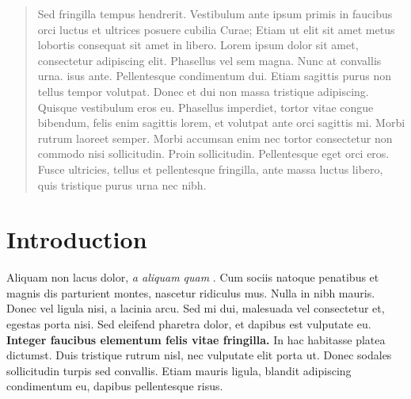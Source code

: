 \documentclass[a0,portrait]{poster}
\begin{document}
\begin{multicols}{2} %


\color{Navy} %

\begin{abstract}

Sed fringilla tempus hendrerit. Vestibulum ante ipsum primis in faucibus orci luctus et ultrices posuere cubilia Curae; Etiam ut elit sit amet metus lobortis consequat sit amet in libero. Lorem ipsum dolor sit amet, consectetur adipiscing elit. Phasellus vel sem magna. Nunc at convallis urna. isus ante. Pellentesque condimentum dui. Etiam sagittis purus non tellus tempor volutpat. Donec et dui non massa tristique adipiscing. Quisque vestibulum eros eu. Phasellus imperdiet, tortor vitae congue bibendum, felis enim sagittis lorem, et volutpat ante orci sagittis mi. Morbi rutrum laoreet semper. Morbi accumsan enim nec tortor consectetur non commodo nisi sollicitudin. Proin sollicitudin. Pellentesque eget orci eros. Fusce ultricies, tellus et pellentesque fringilla, ante massa luctus libero, quis tristique purus urna nec nibh.

\end{abstract}


\color{SaddleBrown} %

\section*{Introduction}

Aliquam non lacus dolor, \textit{a aliquam quam} \cite{zhang2018ndnfit}. Cum sociis natoque penatibus et magnis dis parturient montes, nascetur ridiculus mus. Nulla in nibh mauris. Donec vel ligula nisi, a lacinia arcu. Sed mi dui, malesuada vel consectetur et, egestas porta nisi. Sed eleifend pharetra dolor, et dapibus est vulputate eu. \textbf{Integer faucibus elementum felis vitae fringilla.} In hac habitasse platea dictumst. Duis tristique rutrum nisl, nec vulputate elit porta ut. Donec sodales sollicitudin turpis sed convallis. Etiam mauris ligula, blandit adipiscing condimentum eu, dapibus pellentesque risus.


\end{multicols}
\end{document}
